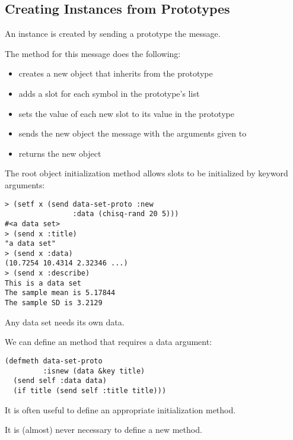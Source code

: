 \begin{slide}{}
\subsection{Creating Instances from Prototypes}
An instance is created by sending a prototype the 
message.

The method for this message does the following:
\begin{itemize}
\item
creates a new object that inherits from the prototype
\item
adds a slot for each symbol in the prototype's 
list
\item
sets the value of each new slot to its value in the prototype
\item
sends the new object the  message with the arguments
given to 
\item
returns the new object
\end{itemize}
\end{slide}

\begin{slide}{}
The root object  initialization method allows slots to
be initialized by keyword arguments:
{\Large
\begin{verbatim}
> (setf x (send data-set-proto :new
                :data (chisq-rand 20 5)))
#<a data set>
> (send x :title)
"a data set"
> (send x :data)
(10.7254 10.4314 2.32346 ...)
> (send x :describe)
This is a data set
The sample mean is 5.17844
The sample SD is 3.2129
\end{verbatim}}
\end{slide}

\begin{slide}{}
Any data set needs its own data.

We can define an  method that requires a data argument:
{\Large
\begin{verbatim}
(defmeth data-set-proto
         :isnew (data &key title)
  (send self :data data)
  (if title (send self :title title)))
\end{verbatim}}
It is often useful to define an appropriate 
initialization method.

It is (almost) never necessary to define a new 
method.
\end{slide}

